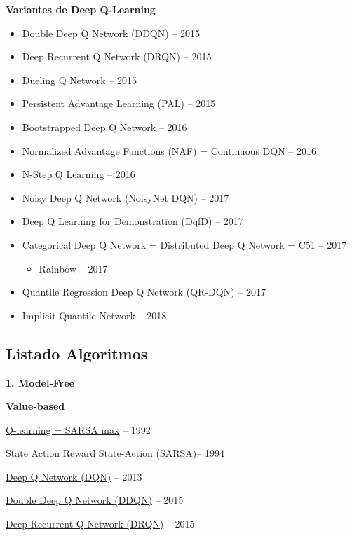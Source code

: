 \documentclass[
  a4paper,
  DIV=11,
  numbers=noendperiod]{scrreprt}
\providecommand{\tightlist}{%
  \setlength{\itemsep}{0pt}\setlength{\parskip}{0pt}}\usepackage{longtable,booktabs,array}
\begin{document}
\textbf{Variantes de Deep Q-Learning}

\begin{itemize}
\tightlist
\item
  Double Deep Q Network (DDQN) -- 2015
\item
  Deep Recurrent Q Network (DRQN) -- 2015
\item
  Dueling Q Network -- 2015
\item
  Persistent Advantage Learning (PAL) -- 2015
\item
  Bootstrapped Deep Q Network -- 2016
\item
  Normalized Advantage Functions (NAF) = Continuous DQN -- 2016
\item
  N-Step Q Learning -- 2016
\item
  Noisy Deep Q Network (NoisyNet DQN) -- 2017
\item
  Deep Q Learning for Demonstration (DqfD) -- 2017
\item
  Categorical Deep Q Network = Distributed Deep Q Network = C51 -- 2017

  \begin{itemize}
  \tightlist
  \item
    Rainbow -- 2017
  \end{itemize}
\item
  Quantile Regression Deep Q Network (QR-DQN) -- 2017
\item
  Implicit Quantile Network -- 2018
\end{itemize}

\hypertarget{listado-algoritmos}{%
\subsection{Listado Algoritmos}\label{listado-algoritmos}}

\textbf{1. Model-Free}

\textbf{Value-based}

\href{https://link.springer.com/content/pdf/10.1007/BF00992698.pdf}{Q-learning
= SARSA max} -- 1992

\href{http://mi.eng.cam.ac.uk/reports/svr-ftp/auto-pdf/rummery_tr166.pdf}{State
Action Reward State-Action (SARSA)}-- 1994

\href{https://www.cs.toronto.edu/~vmnih/docs/dqn.pdf}{Deep Q Network
(DQN)} -- 2013

\href{https://arxiv.org/pdf/1509.06461.pdf}{Double Deep Q Network
(DDQN)} -- 2015

\href{https://arxiv.org/abs/1507.06527}{Deep Recurrent Q Network (DRQN)}
-- 2015
\end{document}
